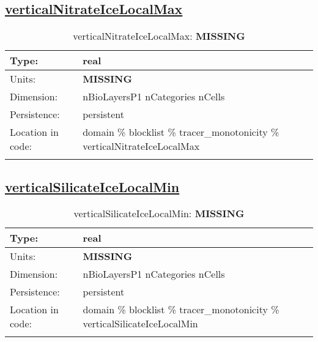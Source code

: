 \subsection[verticalNitrateIceLocalMax]{\hyperref[sec:var_tab_tracer_monotonicity]{verticalNitrateIceLocalMax}}
\label{subsec:var_sec_tracer_monotonicity_verticalNitrateIceLocalMax}
\begin{center}
\begin{longtable}{| p{2.0in} | p{4.0in} |}
        \hline 
        Type: & real \\
        \hline 
        Units: & {\bf \color{red} MISSING} \\
        \hline 
        Dimension: & nBioLayersP1 nCategories nCells \\
        \hline 
        Persistence: & persistent \\
        \hline 
         Location in code: & domain \% blocklist \% tracer\_monotonicity \% verticalNitrateIceLocalMax \\
         \hline 
    \caption{verticalNitrateIceLocalMax: {\bf \color{red} MISSING}}
\end{longtable}
\end{center}
\subsection[verticalSilicateIceLocalMin]{\hyperref[sec:var_tab_tracer_monotonicity]{verticalSilicateIceLocalMin}}
\label{subsec:var_sec_tracer_monotonicity_verticalSilicateIceLocalMin}
\begin{center}
\begin{longtable}{| p{2.0in} | p{4.0in} |}
        \hline 
        Type: & real \\
        \hline 
        Units: & {\bf \color{red} MISSING} \\
        \hline 
        Dimension: & nBioLayersP1 nCategories nCells \\
        \hline 
        Persistence: & persistent \\
        \hline 
         Location in code: & domain \% blocklist \% tracer\_monotonicity \% verticalSilicateIceLocalMin \\
         \hline 
    \caption{verticalSilicateIceLocalMin: {\bf \color{red} MISSING}}
\end{longtable}
\end{center}
